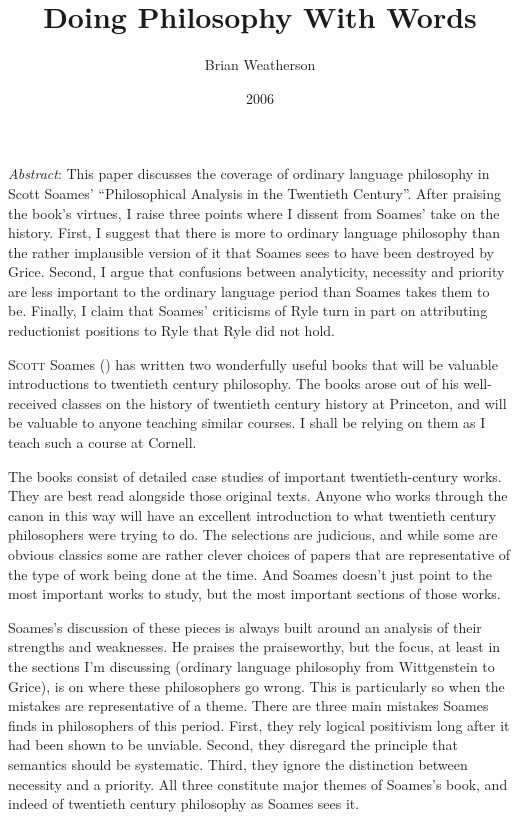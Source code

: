 \documentclass[
  11pt,
  letterpaper,
  DIV=11,
  numbers=noendperiod,
  twoside]{scrartcl}
\title{Doing Philosophy With Words}
\author{Brian Weatherson}
\date{2006}
\renewenvironment{abstract}
 {\vspace{-1.25cm}
 \quotation\small\noindent\emph{Abstract}:}
 {\endquotation}
\renewenvironment{abstract}
 {\quotation\small\noindent\emph{Abstract}:}
 {\endquotation\vspace{-0.02cm}}
\begin{document}
\maketitle
\begin{abstract}
This paper discusses the coverage of ordinary language philosophy in
Scott Soames' ``Philosophical Analysis in the Twentieth Century''. After
praising the book's virtues, I raise three points where I dissent from
Soames' take on the history. First, I suggest that there is more to
ordinary language philosophy than the rather implausible version of it
that Soames sees to have been destroyed by Grice. Second, I argue that
confusions between analyticity, necessity and priority are less
important to the ordinary language period than Soames takes them to be.
Finally, I claim that Soames' criticisms of Ryle turn in part on
attributing reductionist positions to Ryle that Ryle did not hold.
\end{abstract}


\lettrine{S}{cott} Soames () has written
two wonderfully useful books that will be valuable introductions to
twentieth century philosophy. The books arose out of his well-received
classes on the history of twentieth century history at Princeton, and
will be valuable to anyone teaching similar courses. I shall be relying
on them as I teach such a course at Cornell.

The books consist of detailed case studies of important
twentieth-century works. They are best read alongside those original
texts. Anyone who works through the canon in this way will have an
excellent introduction to what twentieth century philosophers were
trying to do. The selections are judicious, and while some are obvious
classics some are rather clever choices of papers that are
representative of the type of work being done at the time. And Soames
doesn't just point to the most important works to study, but the most
important sections of those works.

Soames's discussion of these pieces is always built around an analysis
of their strengths and weaknesses. He praises the praiseworthy, but the
focus, at least in the sections I'm discussing (ordinary language
philosophy from Wittgenstein to Grice), is on where these philosophers
go wrong. This is particularly so when the mistakes are representative
of a theme. There are three main mistakes Soames finds in philosophers
of this period. First, they rely logical positivism long after it had
been shown to be unviable. Second, they disregard the principle that
semantics should be systematic. Third, they ignore the distinction
between necessity and a priority. All three constitute major themes of
Soames's book, and indeed of twentieth century philosophy as Soames sees
it.
\end{document}

